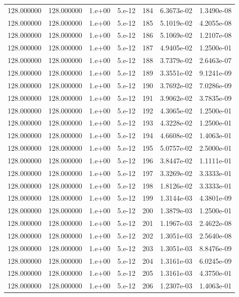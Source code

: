 \begin{table}[htbp]
\begin{tabular}{rrrrrrr}
128.000000 & 128.000000 & 1.e+00 & 5.e-12 & 184 & 6.3673e-02 & 1.3490e-08 \\
128.000000 & 128.000000 & 1.e+00 & 5.e-12 & 185 & 5.1019e-02 & 4.2055e-08 \\
128.000000 & 128.000000 & 1.e+00 & 5.e-12 & 186 & 5.1069e-02 & 1.2107e-08 \\
128.000000 & 128.000000 & 1.e+00 & 5.e-12 & 187 & 4.9405e-02 & 1.2500e-01 \\
128.000000 & 128.000000 & 1.e+00 & 5.e-12 & 188 & 3.7379e-02 & 2.6463e-07 \\
128.000000 & 128.000000 & 1.e+00 & 5.e-12 & 189 & 3.3551e-02 & 9.1241e-09 \\
128.000000 & 128.000000 & 1.e+00 & 5.e-12 & 190 & 3.7692e-02 & 7.0286e-09 \\
128.000000 & 128.000000 & 1.e+00 & 5.e-12 & 191 & 3.9062e-02 & 3.7835e-09 \\
128.000000 & 128.000000 & 1.e+00 & 5.e-12 & 192 & 4.3065e-02 & 1.2500e-01 \\
128.000000 & 128.000000 & 1.e+00 & 5.e-12 & 193 & 4.3228e-02 & 1.2500e-01 \\
128.000000 & 128.000000 & 1.e+00 & 5.e-12 & 194 & 4.6608e-02 & 1.4063e-01 \\
128.000000 & 128.000000 & 1.e+00 & 5.e-12 & 195 & 5.0757e-02 & 2.5000e-01 \\
128.000000 & 128.000000 & 1.e+00 & 5.e-12 & 196 & 3.8447e-02 & 1.1111e-01 \\
128.000000 & 128.000000 & 1.e+00 & 5.e-12 & 197 & 3.3269e-02 & 3.3333e-01 \\
128.000000 & 128.000000 & 1.e+00 & 5.e-12 & 198 & 1.8126e-02 & 3.3333e-01 \\
128.000000 & 128.000000 & 1.e+00 & 5.e-12 & 199 & 1.3144e-03 & 4.3801e-09 \\
128.000000 & 128.000000 & 1.e+00 & 5.e-12 & 200 & 1.3879e-03 & 1.2500e-01 \\
128.000000 & 128.000000 & 1.e+00 & 5.e-12 & 201 & 1.1967e-03 & 2.4622e-08 \\
128.000000 & 128.000000 & 1.e+00 & 5.e-12 & 202 & 1.3051e-03 & 2.5640e-08 \\
128.000000 & 128.000000 & 1.e+00 & 5.e-12 & 203 & 1.3051e-03 & 8.8476e-09 \\
128.000000 & 128.000000 & 1.e+00 & 5.e-12 & 204 & 1.3161e-03 & 6.0245e-09 \\
128.000000 & 128.000000 & 1.e+00 & 5.e-12 & 205 & 1.3161e-03 & 4.3750e-01 \\
128.000000 & 128.000000 & 1.e+00 & 5.e-12 & 206 & 1.2307e-03 & 1.4063e-01 \\

\end{tabular}
\end{table}
